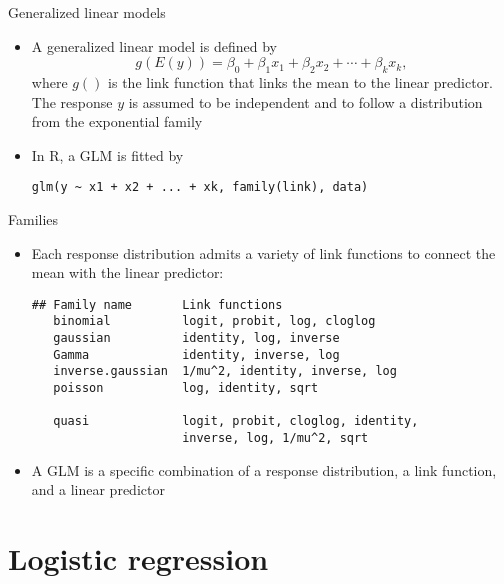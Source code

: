 \documentclass{beamer}
\begin{document}
\begin{frame}[fragile]{Generalized linear models}
  \begin{itemize}
    \item A generalized linear model is defined by
\[
  g(E(y)) = \beta_0 + \beta_1 x_1 + \beta_2 x_2 + \cdots + \beta_k x_k,
\]
where $g()$ is the link function that links the mean to the linear predictor.
The response $y$ is assumed to be independent and to follow a distribution
from the exponential family

\item In R, a GLM is fitted by

  \begin{lstlisting}[style=plain]
  glm(y ~ x1 + x2 + ... + xk, family(link), data)
\end{lstlisting}
  \end{itemize}
\end{frame}

\begin{frame}[fragile]{Families}
  \begin{itemize}
    \item Each response distribution admits a variety of link functions to
      connect the mean with the linear predictor:

  \begin{lstlisting}[style=plain]
## Family name       Link functions
   binomial          logit, probit, log, cloglog
   gaussian          identity, log, inverse
   Gamma             identity, inverse, log
   inverse.gaussian  1/mu^2, identity, inverse, log
   poisson           log, identity, sqrt

   quasi             logit, probit, cloglog, identity,
                     inverse, log, 1/mu^2, sqrt
\end{lstlisting}
\item A GLM is a specific combination of a response distribution, a link
  function, and a linear predictor
  \end{itemize}
\end{frame}

\section{Logistic regression}
\end{document}
